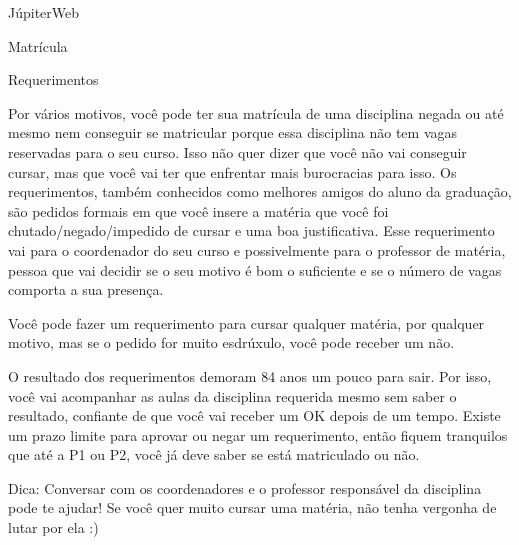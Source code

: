 \begin{secao}{JúpiterWeb}
\begin{subsecao}{Matrícula}
\end{subsecao}

\begin{subsecao}{Requerimentos}

Por vários motivos, você pode ter sua matrícula de uma disciplina negada ou até
mesmo nem conseguir se matricular porque essa disciplina não tem vagas
reservadas para o seu curso. Isso não quer dizer que você não vai conseguir
cursar, mas que você vai ter que enfrentar mais burocracias para isso. Os
requerimentos, também conhecidos como melhores amigos do aluno da graduação,
são pedidos formais em que você insere a matéria que você foi
chutado/negado/impedido de cursar e uma boa justificativa. Esse requerimento
vai para o coordenador do seu curso e possivelmente para o professor de
matéria, pessoa que vai decidir se o seu motivo é bom o suficiente e se o
número de vagas comporta a sua presença.

Você pode fazer um requerimento para cursar qualquer matéria, por qualquer
motivo, mas se o pedido for muito esdrúxulo, você pode receber um não.

O resultado dos requerimentos demoram 84 anos um pouco para sair. Por isso,
você vai acompanhar as aulas da disciplina requerida mesmo sem saber o
resultado, confiante de que você vai receber um OK depois de um tempo. Existe
um prazo limite para aprovar ou negar um requerimento, então fiquem tranquilos
que até a P1 ou P2, você já deve saber se está matriculado ou não.

Dica: Conversar com os coordenadores e o professor responsável da disciplina
pode te ajudar! Se você quer muito cursar uma matéria, não tenha vergonha de
lutar por ela :)

\end{subsecao}

\end{secao}
